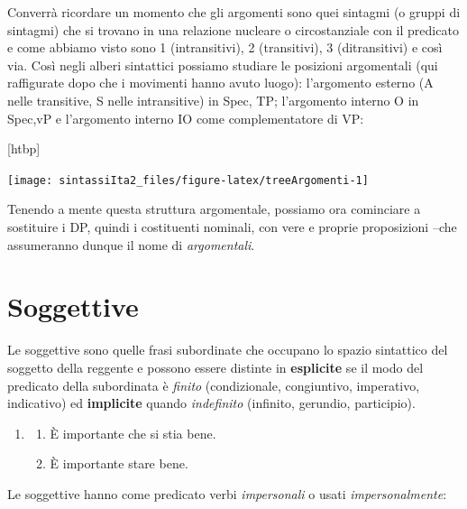 \documentclass[
  a4paper,
  twoside,
  11pt,
  chapterprefix=false,
  bibliography=totocnumbered,
  listof=flat]{scrbook}
\makeatletter
\providecommand{\tightlist}{%
  \setlength{\itemsep}{0pt}\setlength{\parskip}{0pt}}
\def\fps@figure{htbp}
\renewenvironment{figure}[1][\fps@figure]{
  \edef\@tempa{\noexpand\@float{figure}[#1]} 
  \@tempa
  \sffamily
}{
  \end@float
}
\makeatother
\begin{document}
Converrà ricordare un momento che gli argomenti sono quei sintagmi (o gruppi di sintagmi) che si trovano in una relazione nucleare o circostanziale con il predicato e come abbiamo visto sono 1 (intransitivi), 2 (transitivi), 3 (ditransitivi) e così via. Così negli alberi sintattici possiamo studiare le posizioni argomentali (qui raffigurate dopo che i movimenti hanno avuto luogo): l'argomento esterno (A nelle transitive, S nelle intransitive) in Spec, TP; l'argomento interno O in Spec,vP e l'argomento interno IO come complementatore di VP:

\begin{figure}

{\centering \texttt{[image: sintassiIta2\_files/figure-latex/treeArgomenti-1]} 

}

\caption{Struttura argomentale}\label{fig:treeArgomenti}
\end{figure}

Tenendo a mente questa struttura argomentale, possiamo ora cominciare a sostituire i DP, quindi i costituenti nominali, con vere e proprie proposizioni --che assumeranno dunque il nome di \emph{argomentali}.

\hypertarget{soggettive}{%
\section{Soggettive}\label{soggettive}}

Le soggettive sono quelle frasi subordinate che occupano lo spazio sintattico del soggetto della reggente e possono essere distinte in \textbf{esplicite} se il modo del predicato della subordinata è \emph{finito} (condizionale, congiuntivo, imperativo, indicativo) ed \textbf{implicite} quando \emph{indefinito} (infinito, gerundio, participio).

\begin{enumerate}
\def\labelenumi{(\arabic{enumi})}
\setcounter{enumi}{27}
\item
  \begin{enumerate}
  \def\labelenumii{\alph{enumii}.}
  \tightlist
  \item
    È importante che si stia bene.
  \item
    È importante stare bene.
  \end{enumerate}
\end{enumerate}

Le soggettive hanno come predicato verbi \emph{impersonali} o usati \emph{impersonalmente}:
\end{document}

